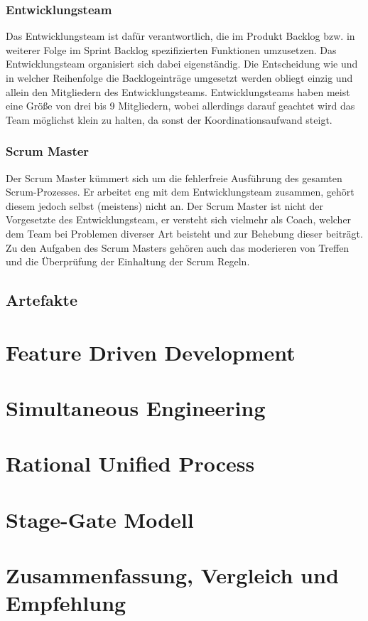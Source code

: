 \documentclass[a4paper, twopage]{scrreprt}
\begin{document}
\subsection{Entwicklungsteam}
Das Entwicklungsteam ist dafür verantwortlich, die im Produkt Backlog bzw. in weiterer Folge im Sprint Backlog spezifizierten Funktionen umzusetzen.
Das Entwicklungsteam organisiert sich dabei eigenständig. Die Entscheidung wie und in welcher Reihenfolge die Backlogeinträge umgesetzt werden obliegt einzig und allein den Mitgliedern des Entwicklungsteams.
Entwicklungsteams haben meist eine Größe von drei bis 9 Mitgliedern, wobei allerdings darauf geachtet wird das Team möglichst klein zu halten, da sonst der Koordinationsaufwand steigt.
\subsection{Scrum Master}
Der Scrum Master kümmert sich um die fehlerfreie Ausführung des gesamten Scrum-Prozesses. Er arbeitet eng mit dem Entwicklungsteam zusammen, gehört diesem jedoch selbst (meistens) nicht an. Der Scrum Master ist nicht der Vorgesetzte des Entwicklungsteam, er versteht sich vielmehr als Coach, welcher dem Team bei Problemen diverser Art beisteht und zur Behebung dieser beiträgt. Zu den Aufgaben des Scrum Masters gehören auch das moderieren von Treffen und die Überprüfung der Einhaltung der Scrum Regeln.

\section{Artefakte}


\chapter{Feature Driven Development}



\chapter{Simultaneous Engineering}



\chapter{Rational Unified Process}



\chapter{Stage-Gate Modell}



\chapter{Zusammenfassung, Vergleich und Empfehlung}
\label{ch:zusammenfassung}



\nocite{*}
\printbibliography

\listoffigures
\end{document}
